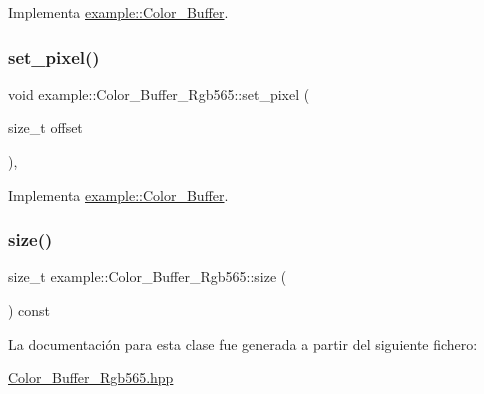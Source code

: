 Implementa \mbox{\hyperlink{classexample_1_1_color___buffer_a967ea326ec0889a36db523727a8154b5}{example\+::\+Color\+\_\+\+Buffer}}.

\mbox{\label{classexample_1_1_color___buffer___rgb565_a53f9763360ddbb788e0dfa0ec5a0a9f9}} 
\subsubsection{\texorpdfstring{set\_pixel()}{set\_pixel()}\hspace{0.1cm}{\footnotesize\ttfamily [2/2]}}
{\footnotesize\ttfamily void example\+::\+Color\+\_\+\+Buffer\+\_\+\+Rgb565\+::set\+\_\+pixel (\begin{DoxyParamCaption}\item[{size\+\_\+t}]{offset }\end{DoxyParamCaption})\hspace{0.3cm}{\ttfamily [inline]}, {\ttfamily [virtual]}}



Implementa \mbox{\hyperlink{classexample_1_1_color___buffer_a1c919e629ef74e418e1ad416d0a5e85a}{example\+::\+Color\+\_\+\+Buffer}}.

\mbox{\label{classexample_1_1_color___buffer___rgb565_a06c7547d382ceba07f96f0b8841c35de}} 
\subsubsection{\texorpdfstring{size()}{size()}}
{\footnotesize\ttfamily size\+\_\+t example\+::\+Color\+\_\+\+Buffer\+\_\+\+Rgb565\+::size (\begin{DoxyParamCaption}{ }\end{DoxyParamCaption}) const\hspace{0.3cm}{\ttfamily [inline]}}



La documentación para esta clase fue generada a partir del siguiente fichero\+:\begin{DoxyCompactItemize}
\item 
\mbox{\hyperlink{_color___buffer___rgb565_8hpp}{Color\+\_\+\+Buffer\+\_\+\+Rgb565.\+hpp}}\end{DoxyCompactItemize}
